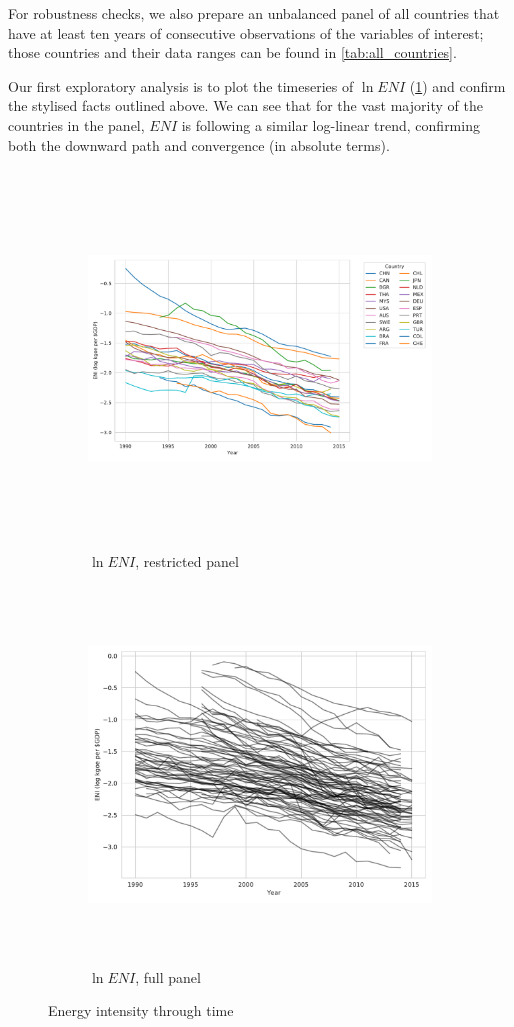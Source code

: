\documentclass[12pt,a4paper]{article}
\begin{document}
For robustness checks, we also prepare an unbalanced panel of all countries that have at least ten years of consecutive observations of the variables of interest; those countries and their data ranges can be found in \cref{tab:all_countries}.

Our first exploratory analysis is to plot the timeseries of $\ln ENI$ (\cref{fig:ENI_timeseries}) and confirm the stylised facts outlined above.
We can see that for the vast majority of the countries in the panel, $ENI$ is following a similar log-linear trend, confirming both the downward path and convergence (in absolute terms).

\begin{figure}[htbp]
\centering
\begin{subfigure}{\textwidth}
\includegraphics[height=10cm]{./plots/dis/timeseries_ENI_subset.pdf}
\caption{$\ln ENI$, restricted panel}
\end{subfigure}
\begin{subfigure}{\textwidth}
\includegraphics[height=10cm]{./plots/dis/timeseries_ENI_all.pdf}
\caption{$\ln ENI$, full panel}
\end{subfigure}
\caption{Energy intensity through time}
\label{fig:ENI_timeseries}
\end{figure}
\end{document}
